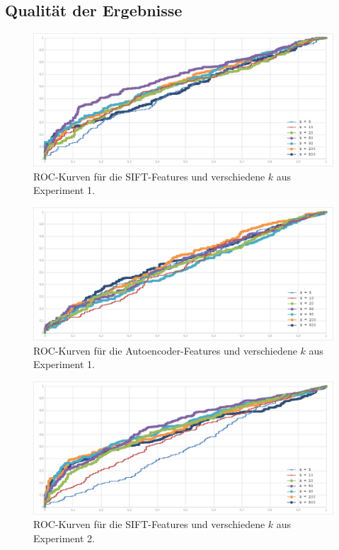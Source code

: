 \subsection{Qualität der Ergebnisse}

\begin{figure}[!htb]
	\centering
	\includegraphics[scale=0.56]{images/exp1_roc128.png}
	\caption{ROC-Kurven für die SIFT-Features und verschiedene $k$ aus Experiment 1.}
	\label{img:roc1}
\end{figure}

\begin{figure}[!htb]
	\centering
	\includegraphics[scale=0.56]{images/exp1_roc36.png}
	\caption{ROC-Kurven für die Autoencoder-Features und verschiedene $k$ aus Experiment 1.}
	\label{img:roc2}
\end{figure}

\begin{figure}[!htb]
	\centering
	\includegraphics[scale=0.56]{images/exp2_roc128.png}
	\caption{ROC-Kurven für die SIFT-Features und verschiedene $k$ aus Experiment 2.}
	\label{img:roc3}
\end{figure}

